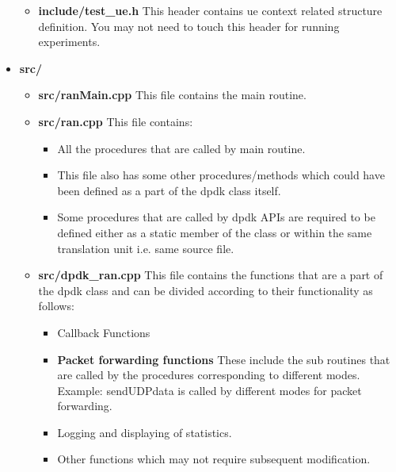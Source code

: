 \documentclass{article}
\begin{document}
\begin{itemize}
\begin{itemize}
              \item \textbf{include/test\_ue.h} This header contains ue context related structure definition. You may not need to touch this header for running experiments.

          \end{itemize}
          \item \textbf{src/}
          \begin{itemize}
    \item \textbf{src/ranMain.cpp}
          This file contains the main routine.
    \item \textbf{src/ran.cpp} This file contains:
          \begin{itemize}
              \item  All the procedures that are called by main routine.
              \item  This file also has some other procedures/methods which could have been defined as a part of the dpdk class itself.
              \item Some procedures that are called by dpdk APIs are required to be defined either as a static member of the class or within the same translation unit i.e. same source file.
          \end{itemize}

    \item \textbf{src/dpdk\_ran.cpp}
          This file contains the functions that are a part of the dpdk class and can be divided according to their functionality as follows:
          \begin{itemize}
              \item Callback Functions
              \item \textbf{Packet forwarding functions} These include the sub routines that are called by the procedures corresponding to different modes. Example: sendUDPdata is called by different modes for packet forwarding.
              \item Logging and displaying of statistics.
              \item Other functions which may not require subsequent modification.
          \end{itemize}


\end{itemize}
\end{itemize}
\end{document}
